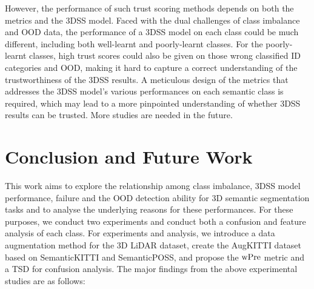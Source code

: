 \documentclass[journal]{IEEEtran}
\begin{document}
However, the performance of such trust scoring methods depends on both the metrics and the 3DSS model. Faced with the dual challenges of class imbalance and OOD data, the performance of a 3DSS model on each class could be much different, including both well-learnt and poorly-learnt classes. For the poorly-learnt classes, high trust scores could also be given on those wrong classified ID categories and OOD, making it hard to capture a correct understanding of the trustworthiness of the 3DSS results. A meticulous design of the metrics that addresses the 3DSS model's various performances on each semantic class is required, which may lead to a more pinpointed understanding of whether 3DSS results can be trusted. More studies are needed in the future.




\section{Conclusion and Future Work}

This work aims to explore the relationship among class imbalance, 3DSS model performance, failure and the OOD detection ability for 3D semantic segmentation tasks and to analyse the underlying reasons for these performances. For these purposes, we conduct two experiments and conduct both a confusion and feature analysis of each class. For experiments and analysis, we introduce a data augmentation method for the 3D LiDAR dataset, create the AugKITTI dataset based on SemanticKITTI and SemanticPOSS, and propose the ${\rm wPre}$ metric and a TSD for confusion analysis. The major findings from the above experimental studies are as follows:
\end{document}
